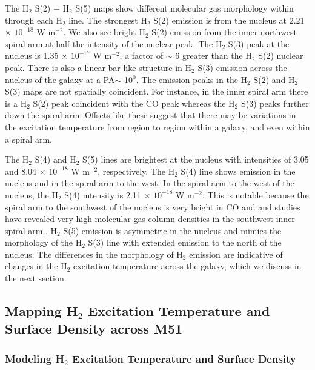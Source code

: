 \documentclass[manuscript]{aastex}
\begin{document}
The $\mathrm{ H_2}$ S(2) $-$ $\mathrm{H_2}$ S(5) maps show different
molecular gas morphology within  through each
$\mathrm{H_2}$ line.  The strongest $\mathrm{H_2}$ S(2) emission is
from the nucleus at 2.21 $\times$ $\mathrm{10^{-18}}$ W
$\mathrm{m^{-2}}$.  We also see bright $\mathrm{H_2}$ S(2) emission
from the inner northwest spiral arm at half the intensity of the
nuclear peak.  The $\mathrm{H_2}$ S(3) peak at the nucleus is 1.35
$\times$ $\mathrm{10^{-17}}$ W $\mathrm{m^{-2}}$, a factor of $\sim$ 6
greater than the $\mathrm{H_2}$ S(2) nuclear peak.  There is also a
linear bar-like structure in $\mathrm{H_2}$ S(3) emission across the
nucleus of the galaxy at a PA$\sim$-10$^0$.  The emission peaks in the
$\mathrm{H_2}$ S(2) and $\mathrm{H_2}$ S(3) maps are not spatially
coincident.  For instance, in the inner spiral arm there is a
$\mathrm{H_2}$ S(2) peak coincident with the CO peak whereas the
$\mathrm{H_2}$ S(3) peaks further down the spiral arm.  Offsets like
these suggest that there may be variations in the excitation
temperature from region to region within a galaxy, and even within a
spiral arm.

The $\mathrm{H_2}$ S(4) and $\mathrm{H_2}$ S(5) lines are brightest at
the nucleus with intensities of 3.05 and 8.04 $\times$
$\mathrm{10^{-18}}$ W $\mathrm{m^{-2}}$, respectively.  The $\mathrm{H_2}$
S(4) line shows emission in the nucleus and in the spiral arm to the
west.  In the spiral arm to the west of the nucleus, the
$\mathrm{H_2}$ S(4) intensity is 2.11 $\times$ $\mathrm{10^{-18}}$ W
$\mathrm{m^{-2}}$.  This is notable because the spiral arm to the
southwest of the nucleus is very bright in CO and and studies have
revealed very high molecular gas column densities in the southwest
inner spiral arm \citep{lor90}.  $\mathrm{H_2}$ S(5) emission is
asymmetric in the nucleus and mimics the morphology of the
$\mathrm{H_2}$ S(3) line with extended emission to the north of the
nucleus.  The differences in the morphology of $\mathrm{H_2}$ emission
are indicative of changes in the $\mathrm{H_2}$ excitation temperature
across the galaxy, which we discuss in the next section.

\subsection{Mapping H$_2$ Excitation Temperature and Surface Density across M51}

\subsubsection{Modeling H$_2$ Excitation Temperature and Surface Density}
\end{document}
